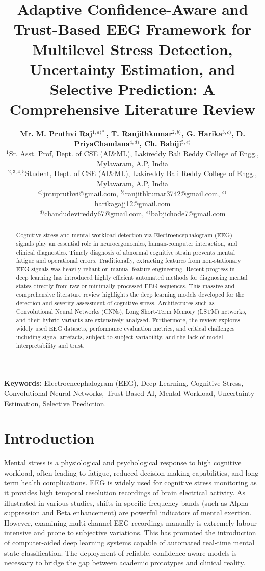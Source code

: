 \documentclass[12pt, a4paper]{article}
\title{\textbf{Adaptive Confidence-Aware and Trust-Based EEG Framework for Multilevel Stress Detection, Uncertainty Estimation, and Selective Prediction: A Comprehensive Literature Review}}
\author{
    \textbf{Mr. M. Pruthvi Raj$^{1, a)*}$, T. Ranjithkumar$^{2, b)}$, G. Harika$^{3, c)}$, D. PriyaChandana$^{4, d)}$, Ch. Babiji$^{5, e)}$} \\
    \vspace{0.2cm}
    $^{1}$Sr. Asst. Prof, Dept. of CSE (AI\&ML), Lakireddy Bali Reddy College of Engg., Mylavaram, A.P, India \\
    $^{2,3,4,5}$Student, Dept. of CSE (AI\&ML), Lakireddy Bali Reddy College of Engg., Mylavaram, A.P, India \\
    \vspace{0.2cm}
    \small $^{a)}$jntupruthvi@gmail.com, $^{b)}$ranjithkumar3742@gmail.com, $^{c)}$harikagajj12@gmail.com \\
    \small $^{d)}$chandudevireddy67@gmail.com, $^{e)}$babjichode7@gmail.com
}
\date{}
\begin{document}
\maketitle

\begin{abstract}
Cognitive stress and mental workload detection via Electroencephalogram (EEG) signals play an essential role in neuroergonomics, human-computer interaction, and clinical diagnostics. Timely diagnosis of abnormal cognitive strain prevents mental fatigue and operational errors. Traditionally, extracting features from non-stationary EEG signals was heavily reliant on manual feature engineering. Recent progress in deep learning has introduced highly efficient automated methods for diagnosing mental states directly from raw or minimally processed EEG sequences. This massive and comprehensive literature review highlights the deep learning models developed for the detection and severity assessment of cognitive stress. Architectures such as Convolutional Neural Networks (CNNs), Long Short-Term Memory (LSTM) networks, and their hybrid variants are extensively analysed. Furthermore, the review explores widely used EEG datasets, performance evaluation metrics, and critical challenges including signal artefacts, subject-to-subject variability, and the lack of model interpretability and trust.
\end{abstract}

\vspace{0.5cm}
\noindent\textbf{Keywords:} Electroencephalogram (EEG), Deep Learning, Cognitive Stress, Convolutional Neural Networks, Trust-Based AI, Mental Workload, Uncertainty Estimation, Selective Prediction.

\newpage
\tableofcontents
\newpage

\section{Introduction}
Mental stress is a physiological and psychological response to high cognitive workload, often leading to fatigue, reduced decision-making capabilities, and long-term health complications. EEG is widely used for cognitive stress monitoring as it provides high temporal resolution recordings of brain electrical activity. As illustrated in various studies, shifts in specific frequency bands (such as Alpha suppression and Beta enhancement) are powerful indicators of mental exertion. However, examining multi-channel EEG recordings manually is extremely labour-intensive and prone to subjective variations. This has promoted the introduction of computer-aided deep learning systems capable of automated real-time mental state classification. The deployment of reliable, confidence-aware models is necessary to bridge the gap between academic prototypes and clinical reality.
\end{document}

